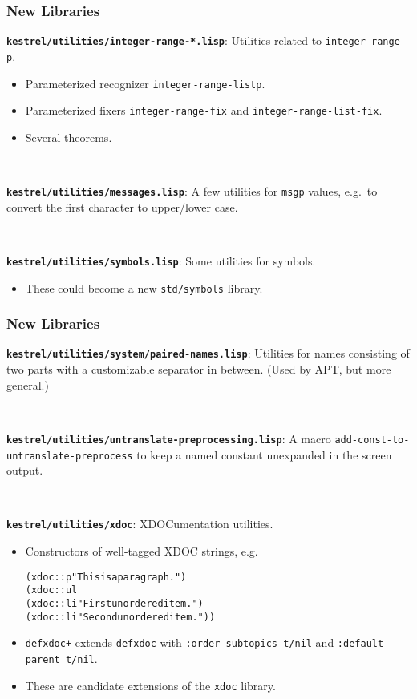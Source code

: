 \documentclass{beamer}
\newcommand{\code}[1]{\texttt{#1}}
\newenvironment{codeblock}{\begin{alltt}}{\end{alltt}}
\newcommand{\bookpath}[1]{\textbf{\code{#1}}}
\newcommand{\newlibtitle}{\frametitle{New Libraries}}
\begin{document}

\begin{frame}

\newlibtitle

\bookpath{kestrel/utilities/integer-range-*.lisp}:
Utilities related to \code{integer-range-p}.
\begin{itemize}
\item
Parameterized recognizer \code{integer-range-listp}.
\item
Parameterized fixers
\code{integer-range-fix} and \code{integer-range-list-fix}.
\item
Several theorems.
\end{itemize}

\

\bookpath{kestrel/utilities/messages.lisp}:
A few utilities for \code{msgp} values,
e.g.\ to convert the first character to upper/lower case.

\

\bookpath{kestrel/utilities/symbols.lisp}:
Some utilities for symbols.
\begin{itemize}
\item
These could become a new \code{std/symbols} library.
\end{itemize}

\end{frame}


\begin{frame}

\newlibtitle

\bookpath{kestrel/utilities/system/paired-names.lisp}:
Utilities for names consisting of
two parts with a customizable separator in between.
(Used by APT, but more general.)

\

\bookpath{kestrel/utilities/untranslate-preprocessing.lisp}:
A macro \code{add-const-to-untranslate-preprocess}
to keep a named constant unexpanded in the screen output.

\

\bookpath{kestrel/utilities/xdoc}:
XDOCumentation utilities.
\begin{itemize}
\item
Constructors of well-tagged XDOC strings, e.g.
\begin{codeblock}
(xdoc::p "This is a paragraph.")
(xdoc::ul
  (xdoc::li "First unordered item.")
  (xdoc::li "Second unordered item."))
\end{codeblock}
\item
\code{defxdoc+} extends \code{defxdoc} with
\code{:order-subtopics t/nil} and \code{:default-parent t/nil}.
\item
These are candidate extensions of the \code{xdoc} library.
\end{itemize}

\end{frame}
\end{document}
